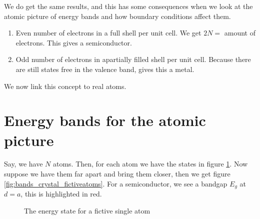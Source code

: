 We do get the same results, and this has some consequences when we look at the atomic picture of energy bands and how boundary conditions affect them.
\begin{enumerate}
	\setlength\itemsep{0pt}
	\item Even number of electrons in a full shell per unit cell. We get $2N =$ amount of electrons. This gives a semiconductor.
	\item Odd number of electrons in apartially filled shell per unit cell. Because there are still states free in the valence band, gives this a metal.
\end{enumerate}
We now link this concept to real atoms.

\section{Energy bands for the atomic picture} \label{sec:atomic_picture}
Say, we have $N$ atoms. Then, for each atom we have the states in figure \ref{fig:state_one_atom}. Now suppose we have them far apart and bring them closer, then we get figure \ref{fig:bands_crystal_fictiveatoms}. For a semiconductor, we see a bandgap $E_g$ at $d = a$, this is highlighted in red.
\begin{figure}[h]
	\centering
	\caption{The energy state for a fictive single atom}
	\label{fig:state_one_atom}
\end{figure}
